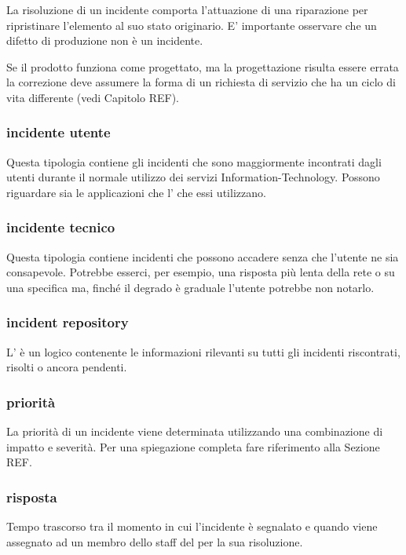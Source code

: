 La risoluzione di un incidente comporta l'attuazione di una riparazione per ripristinare l'elemento al suo stato originario. E' importante osservare che un difetto di produzione non è un incidente.

Se il prodotto funziona come progettato, ma la progettazione risulta essere errata la correzione deve assumere la forma di un richiesta di servizio che ha un ciclo di vita differente (vedi Capitolo REF).

\subsubsection{incidente utente}
Questa tipologia contiene gli incidenti che sono maggiormente incontrati dagli utenti durante il normale utilizzo dei servizi \acs{Information-Technology}. Possono riguardare sia le applicazioni che l' che essi utilizzano.

\subsubsection{incidente tecnico}
Questa tipologia contiene incidenti che possono accadere senza che l'utente ne sia consapevole. Potrebbe esserci, per esempio, una risposta più lenta della rete o su una specifica  ma, finché il degrado è graduale l'utente potrebbe non notarlo.

\subsubsection{incident repository}
L' è un  logico contenente le informazioni rilevanti su tutti gli incidenti riscontrati, risolti o ancora pendenti.

\subsubsection{priorità}
La priorità di un incidente viene determinata utilizzando una combinazione di impatto e severità. Per una spiegazione completa fare riferimento alla Sezione REF.

\subsubsection{risposta}
Tempo trascorso tra il momento in cui l'incidente è segnalato e quando viene assegnato ad un membro dello staff del  per la sua risoluzione.

